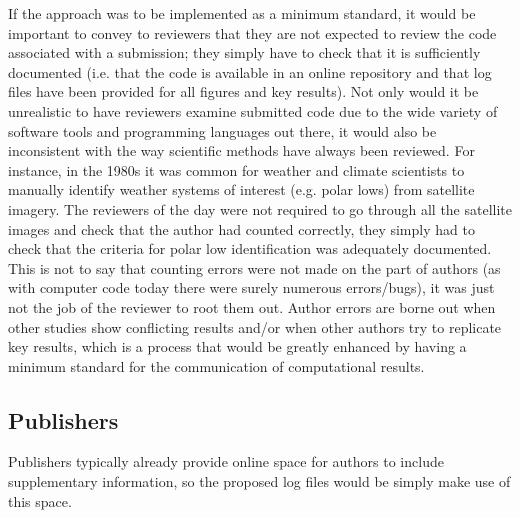 If the \citet{Irving2015} approach was to be implemented as a minimum standard, it would be important to convey to reviewers that they are not expected to review the code associated with a submission; they simply have to check that it is sufficiently documented (i.e. that the code is available in an online repository and that log files have been provided for all figures and key results). Not only would it be unrealistic to have reviewers examine submitted code due to the wide variety of software tools and programming languages out there, it would also be inconsistent with the way scientific methods have always been reviewed. For instance, in the 1980s it was common for weather and climate scientists to manually identify weather systems of interest (e.g. polar lows) from satellite imagery. The reviewers of the day were not required to go through all the satellite images and check that the author had counted correctly, they simply had to check that the criteria for polar low identification was adequately documented. This is not to say that counting errors were not made on the part of authors (as with computer code today there were surely numerous errors/bugs), it was just not the job of the reviewer to root them out. Author errors are borne out when other studies show conflicting results and/or when other authors try to replicate key results, which is a process that would be greatly enhanced by having a minimum standard for the communication of computational results.

\subsection{Publishers}

Publishers typically already provide online space for authors to include supplementary information, so the proposed log files would be simply make use of this space. 